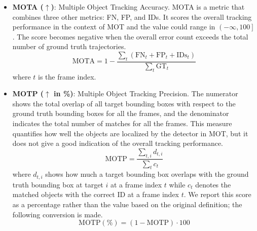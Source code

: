 \begin{itemize}
\item \textbf{MOTA ($\uparrow$)}: Multiple Object Tracking Accuracy. MOTA is a metric that combines three other metrics: FN, FP, and IDs. It scores the overall tracking performance in the context of MOT and the value could range in $\left( -\infty, 100 \right]$. The score becomes negative when the overall error count exceeds the total number of ground truth trajectories.
\begin{equation}
\text{MOTA} = 1 - \frac{\sum_{t} (\text{FN}_{t} + \text{FP}_{t} + \text{IDs}_{t})}{\sum_{t}\text{GT}_{t}}
\label{eqn:MOTA}
\end{equation}
where $t$ is the frame index.

\item \textbf{MOTP ($\uparrow$ in \%)}: Multiple Object Tracking Precision. The numerator shows the total overlap of all target bounding boxes with respect to the ground truth bounding boxes for all the frames, and the denominator indicates the total number of matches for all the frames. This measure quantifies how well the objects are localized by the detector in MOT, but it does not give a good indication of the overall tracking performance.
\begin{equation} 
\text{MOTP} = \frac{\sum_{t,i} d_{t,i}}{\sum_{t}c_{t}}
\label{eqn:MOTP}
\end{equation}
where $d_{t,i}$ shows how much a target bounding box overlaps with the ground truth bounding box at target $i$ at a frame index $t$ while $c_{t}$ denotes the matched objects with the correct ID at a frame index $t$. We report this score as a percentage rather than the value based on the original definition; the following conversion is made.
\begin{equation} 
\text{MOTP} (\%) = (1 - \text{MOTP}) \cdot 100
\label{eqn:MOTP_percentage}
\end{equation}

\end{itemize}

